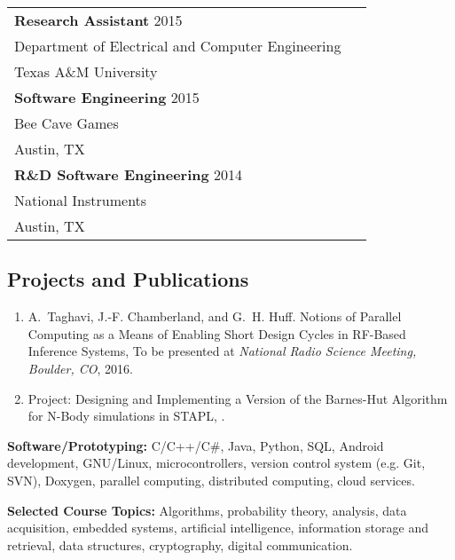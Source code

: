 \begin{center}
\begin{tabular}{p{0.95\linewidth}}
\textbf{Research Assistant} \hfill 2015 \\
Department of Electrical and Computer Engineering \\
Texas A\&M University \\[4pt]
\textbf{Software Engineering} \hfill 2015 \\
Bee Cave Games \\
Austin, TX \\[4pt]
\textbf{R\&D Software Engineering} \hfill 2014 \\
National Instruments \\
Austin, TX
\end{tabular}
\end{center}

\subsection*{Projects and Publications}

\begin{enumerate}    \itemsep0pt
\item A.~Taghavi, J.-F. Chamberland, and G.~H. Huff.
\newblock Notions of Parallel Computing as a Means of Enabling Short Design Cycles in RF-Based Inference Systems,
\newblock To be presented at {\em National Radio Science Meeting, Boulder, CO}, 2016.

\item Project: 
\newblock Designing and Implementing a Version of the Barnes-Hut Algorithm for N-Body simulations in STAPL,
.
\end{enumerate}

\textbf{Software/Prototyping:} C/C++/C\#, Java, Python, SQL,
Android development, GNU/Linux, microcontrollers,
version control system (e.g. Git, SVN), Doxygen,
parallel computing, distributed computing, cloud services.

\textbf{Selected Course Topics:} Algorithms, probability theory, analysis, data acquisition, embedded systems, artificial intelligence, information storage and retrieval, data structures, cryptography, digital communication.

